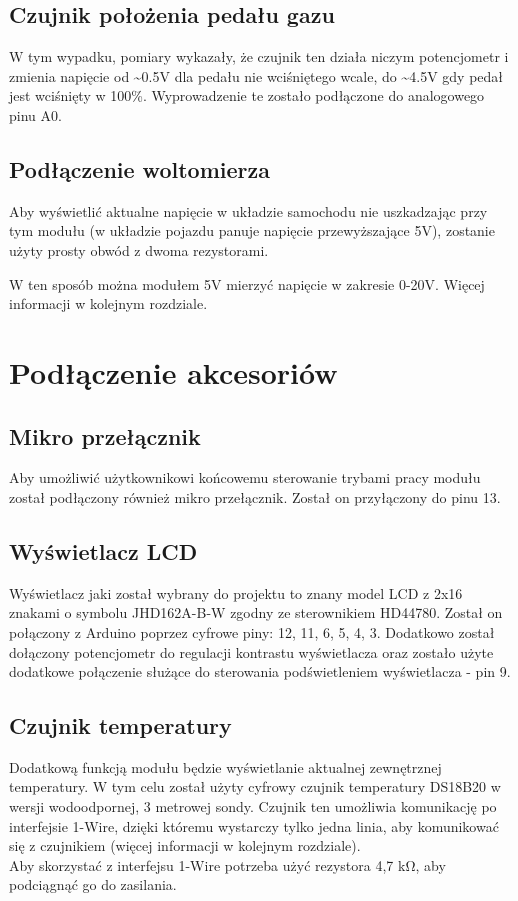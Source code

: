 \subsection{Czujnik położenia pedału gazu}
W tym wypadku, pomiary wykazały, że czujnik ten działa niczym potencjometr i zmienia napięcie od \textasciitilde0.5V dla pedału nie wciśniętego wcale, do \textasciitilde4.5V gdy pedał jest wciśnięty w 100\%. Wyprowadzenie te zostało podłączone do analogowego pinu A0.

\subsection{Podłączenie woltomierza} \label{voltometer}

Aby wyświetlić aktualne napięcie w układzie samochodu nie uszkadzając przy tym modułu (w układzie pojazdu panuje napięcie przewyższające 5V), zostanie użyty prosty obwód z dwoma rezystorami.


W ten sposób można modułem 5V mierzyć napięcie w zakresie 0-20V. Więcej informacji w kolejnym rozdziale.

\section{Podłączenie akcesoriów}

\subsection{Mikro przełącznik}
Aby umożliwić użytkownikowi końcowemu sterowanie trybami pracy modułu został podłączony również mikro przełącznik. Został on przyłączony do pinu 13.

\subsection{Wyświetlacz LCD}
Wyświetlacz jaki został wybrany do projektu to znany model LCD z 2x16 znakami o symbolu JHD162A-B-W zgodny ze sterownikiem HD44780. Został on połączony z Arduino poprzez cyfrowe piny: 12, 11, 6, 5, 4, 3. Dodatkowo został dołączony potencjometr do regulacji kontrastu wyświetlacza oraz zostało użyte dodatkowe połączenie służące do sterowania podświetleniem wyświetlacza - pin 9.


\subsection{Czujnik temperatury}
Dodatkową funkcją modułu będzie wyświetlanie aktualnej zewnętrznej temperatury. W tym celu został użyty cyfrowy czujnik temperatury DS18B20 w wersji wodoodpornej, 3 metrowej sondy. Czujnik ten umożliwia komunikację po interfejsie 1-Wire, dzięki któremu wystarczy tylko jedna linia, aby komunikować się z czujnikiem (więcej informacji w kolejnym rozdziale).\\
Aby skorzystać z interfejsu 1-Wire potrzeba użyć rezystora 4,7 kΩ, aby podciągnąć go do zasilania.

